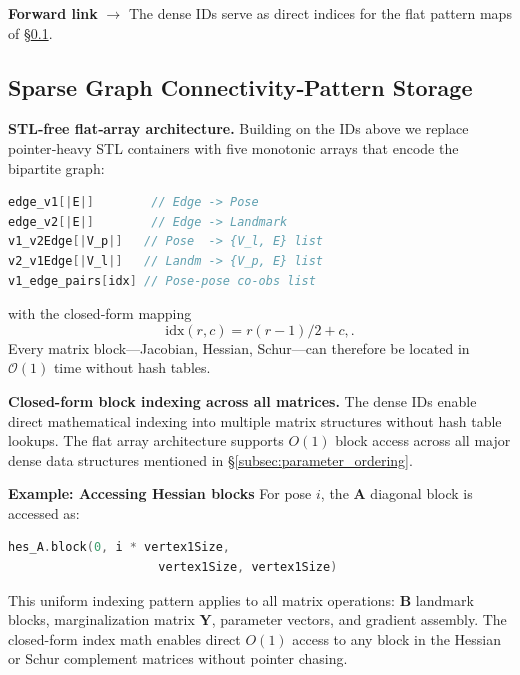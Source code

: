 \textbf{Forward link} $\rightarrow$ The dense IDs serve as direct indices for the flat pattern maps of
§\ref{subsec:connectivity_storage}.

\subsection{Sparse Graph Connectivity‑Pattern Storage}
\label{subsec:connectivity_storage}

\textbf{STL‑free flat‑array architecture.} Building on the IDs above we replace pointer‑heavy STL
containers with five monotonic arrays that encode the bipartite graph:

\begin{lstlisting}[language=C++, basicstyle=\ttfamily\small]
edge_v1[|E|]        // Edge -> Pose
edge_v2[|E|]        // Edge -> Landmark
v1_v2Edge[|V_p|]   // Pose  -> {V_l, E} list
v2_v1Edge[|V_l|]   // Landm -> {V_p, E} list
v1_edge_pairs[idx] // Pose-pose co-obs list
\end{lstlisting}

with the closed‑form mapping
\begin{equation}
\text{idx}(r,c)=r(r-1)/2+c, .
\end{equation}
Every matrix block—Jacobian, Hessian, Schur—can therefore be located in $\mathcal O(1)$ time
without hash tables.

\textbf{Closed-form block indexing across all matrices.} The dense IDs enable direct mathematical indexing 
into multiple matrix structures without hash table lookups. The flat array architecture supports $O(1)$ 
block access across all major dense data structures mentioned in \S\ref{subsec:parameter_ordering}.


\hspace{-1.5em}
\textbf{Example: Accessing Hessian blocks} \newline
    For pose $i$, the $\mathbf{A}$ diagonal block is accessed as:
\begin{lstlisting}[language=C++, basicstyle=\ttfamily\small]
hes_A.block(0, i * vertex1Size, 
                     vertex1Size, vertex1Size)
\end{lstlisting}

This uniform indexing pattern applies to all matrix operations: $\mathbf{B}$ landmark blocks, 
marginalization matrix $\mathbf{Y}$, parameter vectors, and gradient assembly. The closed-form index 
math enables direct $O(1)$ access to any block in the Hessian or Schur complement matrices without 
pointer chasing.

